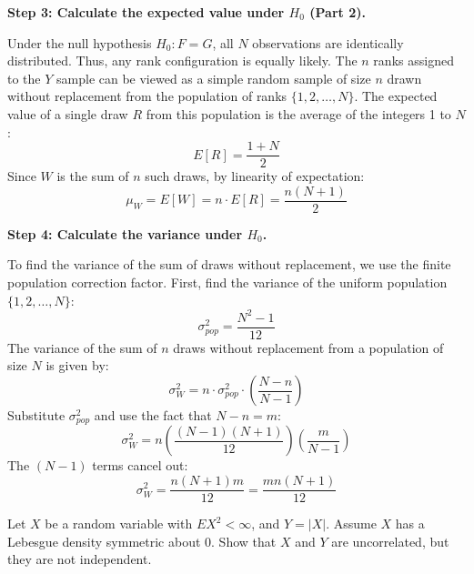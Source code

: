 \begin{solution}
\textbf{Step 3: Calculate the expected value under $H_0$ (Part 2).}

Under the null hypothesis $H_0: F = G$, all $N$ observations are identically distributed. Thus, any rank configuration is equally likely.
The $n$ ranks assigned to the $Y$ sample can be viewed as a simple random sample of size $n$ drawn without replacement from the population of ranks $\{1, 2, \dots, N\}$.
The expected value of a single draw $R$ from this population is the average of the integers 1 to $N$:
\[ E[R] = \frac{1 + N}{2} \]
Since $W$ is the sum of $n$ such draws, by linearity of expectation:
\[ \mu_W = E[W] = n \cdot E[R] = \frac{n(N+1)}{2} \]

\textbf{Step 4: Calculate the variance under $H_0$.}

To find the variance of the sum of draws without replacement, we use the finite population correction factor.
First, find the variance of the uniform population $\{1, 2, \dots, N\}$:
\[ \sigma_{pop}^2 = \frac{N^2 - 1}{12} \]
The variance of the sum of $n$ draws without replacement from a population of size $N$ is given by:
\[ \sigma_W^2 = n \cdot \sigma_{pop}^2 \cdot \left( \frac{N - n}{N - 1} \right) \]
Substitute $\sigma_{pop}^2$ and use the fact that $N - n = m$:
\[ \sigma_W^2 = n \left( \frac{(N-1)(N+1)}{12} \right) \left( \frac{m}{N-1} \right) \]
The $(N-1)$ terms cancel out:
\[ \sigma_W^2 = \frac{n(N+1)m}{12} = \frac{mn(N+1)}{12} \]
\end{solution}

\begin{exercise}\label{probability:2012:5}
Let $X$ be a random variable with $E X^2 < \infty$, and $Y = |X|$. Assume $X$ has a Lebesgue density symmetric about 0. Show that $X$ and $Y$ are uncorrelated, but they are not independent.
\end{exercise}

